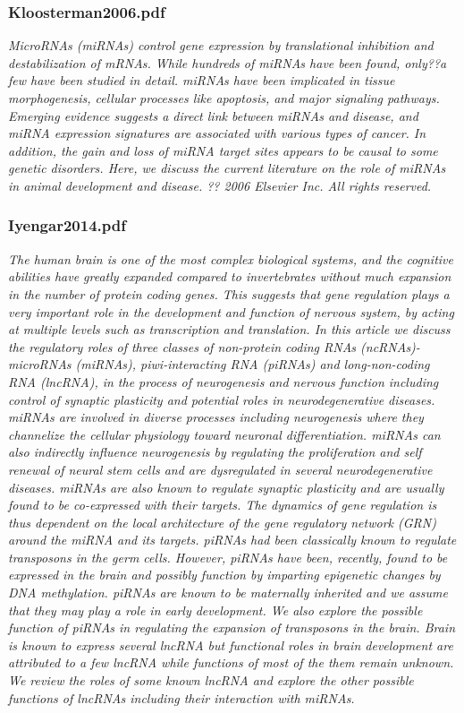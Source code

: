 \documentclass[graybox]{svmult}
\begin{document}
\subsubsection{Kloosterman2006.pdf}

\cite{Kloosterman2006}
\textit{MicroRNAs (miRNAs) control gene expression by translational inhibition 
and destabilization of mRNAs. While hundreds of miRNAs have been found, only??a 
few have been studied in detail. miRNAs have been implicated in tissue 
morphogenesis, cellular processes like apoptosis, and major signaling pathways. 
Emerging evidence suggests a direct link between miRNAs and disease, and miRNA 
expression signatures are associated with various types of cancer. In addition, 
the gain and loss of miRNA target sites appears to be causal to some genetic 
disorders. Here, we discuss the current literature on the role of miRNAs in 
animal development and disease. ?? 2006 Elsevier Inc. All rights reserved.}

\subsubsection{Iyengar2014.pdf}

\cite{Iyengar2014}
\textit{The human brain is one of the most complex biological systems, and the 
cognitive abilities have greatly expanded compared to invertebrates without much 
expansion in the number of protein coding genes. This suggests that gene 
regulation plays a very important role in the development and function of 
nervous system, by acting at multiple levels such as transcription and 
translation. In this article we discuss the regulatory roles of three classes of 
non-protein coding RNAs (ncRNAs)-microRNAs (miRNAs), piwi-interacting RNA 
(piRNAs) and long-non-coding RNA (lncRNA), in the process of neurogenesis and 
nervous function including control of synaptic plasticity and potential roles in 
neurodegenerative diseases. miRNAs are involved in diverse processes including 
neurogenesis where they channelize the cellular physiology toward neuronal 
differentiation. miRNAs can also indirectly influence neurogenesis by regulating 
the proliferation and self renewal of neural stem cells and are dysregulated in 
several neurodegenerative diseases. miRNAs are also known to regulate synaptic 
plasticity and are usually found to be co-expressed with their targets. The 
dynamics of gene regulation is thus dependent on the local architecture of the 
gene regulatory network (GRN) around the miRNA and its targets. piRNAs had been 
classically known to regulate transposons in the germ cells. However, piRNAs 
have been, recently, found to be expressed in the brain and possibly function by 
imparting epigenetic changes by DNA methylation. piRNAs are known to be 
maternally inherited and we assume that they may play a role in early 
development. We also explore the possible function of piRNAs in regulating the 
expansion of transposons in the brain. Brain is known to express several lncRNA 
but functional roles in brain development are attributed to a few lncRNA while 
functions of most of the them remain unknown. We review the roles of some known 
lncRNA and explore the other possible functions of lncRNAs including their 
interaction with miRNAs.}
\end{document}
